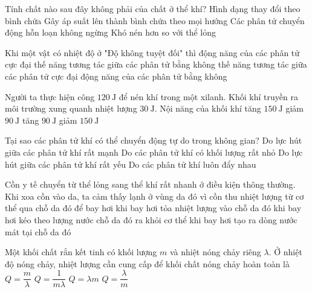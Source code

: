 \begin{ex}
	Tính chất nào sau đây không phải của chất ở thể khí?
	\choice
	{Hình dạng thay đổi theo bình chứa}
	{Gây áp suất lên thành bình chứa theo mọi hướng}
	{Các phân tử chuyển động hỗn loạn không ngừng}
	{\True Khó nén hơn so với thể lỏng}
	\loigiai{}
\end{ex}
\begin{ex}
	Khi một vật có nhiệt độ ở "Độ không tuyệt đối" thì
	\choice
	{động năng của các phân tử cực đại}
	{thế năng tương tác giữa các phân tử bằng không}
	{thế năng tương tác giữa các phân tử cực đại}
	{\True động năng của các phân tử bằng không}
	\loigiai{}
\end{ex}
\begin{ex}
	Người ta thực hiện công $\SI{120}{\joule}$ để nén khí trong một xilanh. Khối khí truyền ra môi trường xung quanh nhiệt lượng $\SI{30}{\joule}$. Nội năng của khối khí
	\choice
	{tăng $\SI{150}{\joule}$}
	{giảm $\SI{90}{\joule}$}
	{\True tăng $\SI{90}{\joule}$}
	{giảm $\SI{150}{\joule}$}
\end{ex}
\begin{ex}
	Tại sao các phân tử khí có thể chuyển động tự do trong không gian?
	\choice
	{Do lực hút giữa các phân tử khí rất mạnh}
	{Do các phân tử khí có khối lượng rất nhỏ}
	{\True Do lực hút giữa các phân tử khí rất yếu}
	{Do các phân tử khí luôn đẩy nhau}
	\loigiai{}
\end{ex}
\begin{ex}
	Cồn y tế chuyển từ thể lỏng sang thể khí rất nhanh ở điều kiện thông thường. Khi xoa cồn vào da, ta cảm thấy lạnh ở vùng da đó vì cồn
	\choice
	{\True thu nhiệt lượng từ cơ thể qua chỗ da đó để bay hơi}
	{khi bay hơi tỏa nhiệt lượng vào chỗ da đó}
	{khi bay hơi kéo theo lượng nước chỗ da đó ra khỏi cơ thể}
	{khi bay hơi tạo ra dòng nước mát tại chỗ da đó}
	\loigiai{}
\end{ex}
\begin{ex}
	Một khối chất rắn kết tinh có khối lượng $m$ và nhiệt nóng chảy riêng $\lambda$. Ở nhiệt độ nóng chảy, nhiệt lượng cần cung cấp để khối chất nóng chảy hoàn toàn là
	\choice
	{$Q=\dfrac{m}{\lambda}$}
	{$Q=\dfrac{1}{m\lambda}$}
	{\True $Q=\lambda m$}
	{$Q=\dfrac{\lambda}{m}$}
	\loigiai{}
\end{ex}
